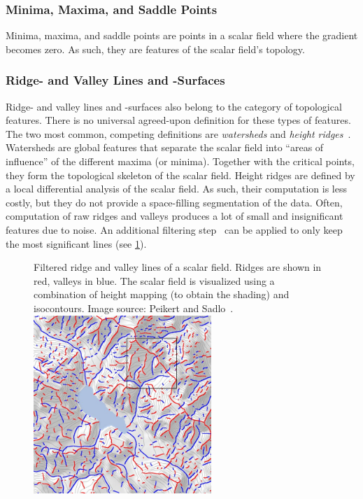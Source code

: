 %
\subsubsection{Minima, Maxima, and Saddle Points}
%
Minima, maxima, and saddle points are points in a scalar field where
the gradient becomes zero.
%
As such, they are features of the scalar field's topology.
%
%

%
\subsubsection{Ridge- and Valley Lines and -Surfaces}
%
Ridge- and valley lines and -surfaces also belong to the category
of topological features.
%
There is no universal agreed-upon definition for these types of features.
%
The two most common, competing definitions are \emph{watersheds} and
\emph{height ridges}~\cite{Peikert2008,Eberly2012}.
%
Watersheds are global features that separate the scalar field into ``areas of
influence'' of the different maxima (or minima).
%
Together with the critical points, they form the topological skeleton of the
scalar field.
%
Height ridges are defined by a local differential analysis of the scalar field.
%
As such, their computation is less costly, but they do not provide a
space-filling segmentation of the data.
%
Often, computation of raw ridges and valleys produces a lot of small and
insignificant features due to noise.
%
An additional filtering step~\cite{Peikert2008} can be applied to only keep the most significant
lines (see \cref{fig:ridge_valley_lines}).
%
\begin{figure}[t]
    \begin{captionbeside}
        {Filtered ridge and valley lines of a scalar field.
        Ridges are shown in red, valleys in blue. The scalar field is visualized
        using a combination of height mapping (to obtain the shading) and
        isocontours. Image source: Peikert and Sadlo~\cite{Peikert2008}.
        \label{fig:ridge_valley_lines}}
        \includegraphics[width=0.6\textwidth]{figures/ridge_valley_lines_peikert.jpg}
    \end{captionbeside}
\end{figure}
%
%
%

